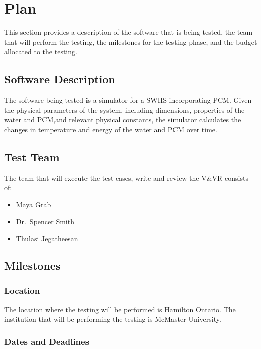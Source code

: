 \documentclass[12pt]{article}
\begin{document}
%
%

\section{Plan}
This section provides a description of the software that is being tested, the team that will
perform the testing, the milestones for the testing phase, and the budget allocated to the testing. 

\subsection{Software Description}
The software being tested is a simulator for a SWHS
incorporating PCM. Given the physical parameters of the system,
 including dimensions, properties of the water and PCM,and relevant physical constants,
  the simulator calculates the changes in temperature and energy of the water and PCM 
  over time.

\subsection{Test Team} 
The team that will execute the test cases, write and review the V\&VR consists of:

\begin{itemize}
 \item Maya Grab 
 \item Dr.\ Spencer Smith
 \item Thulasi Jegatheesan 
\end{itemize}  

\subsection{Milestones}

\subsubsection{Location}
The location where the testing will be performed is Hamilton Ontario. The institution that
will be performing the testing is McMaster University. 


\subsubsection{Dates and Deadlines}
\end{document}
